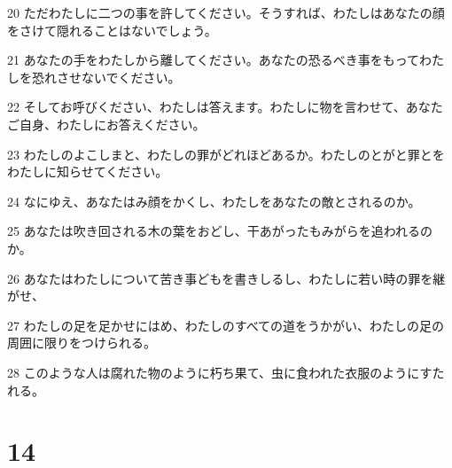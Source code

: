 \par 20 ただわたしに二つの事を許してください。そうすれば、わたしはあなたの顔をさけて隠れることはないでしょう。
\par 21 あなたの手をわたしから離してください。あなたの恐るべき事をもってわたしを恐れさせないでください。
\par 22 そしてお呼びください、わたしは答えます。わたしに物を言わせて、あなたご自身、わたしにお答えください。
\par 23 わたしのよこしまと、わたしの罪がどれほどあるか。わたしのとがと罪とをわたしに知らせてください。
\par 24 なにゆえ、あなたはみ顔をかくし、わたしをあなたの敵とされるのか。
\par 25 あなたは吹き回される木の葉をおどし、干あがったもみがらを追われるのか。
\par 26 あなたはわたしについて苦き事どもを書きしるし、わたしに若い時の罪を継がせ、
\par 27 わたしの足を足かせにはめ、わたしのすべての道をうかがい、わたしの足の周囲に限りをつけられる。
\par 28 このような人は腐れた物のように朽ち果て、虫に食われた衣服のようにすたれる。

\chapter{14}

